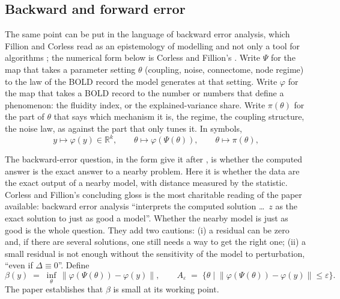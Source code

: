 \documentclass[11pt]{article}
\begin{document}
\subsection{Backward and forward error}
The same point can be put in the language of backward error analysis, which Fillion and Corless read as an epistemology of modelling and not only a tool for algorithms \parencite{fillion2014}; the numerical form below is Corless and Fillion's \parencite{corless2016}. Write $\Psi$ for the map that takes a parameter setting $\theta$ (coupling, noise, connectome, node regime) to the law of the BOLD record the model generates at that setting. Write $\varphi$ for the map that takes a BOLD record to the number or numbers that define a phenomenon: the fluidity index, or the explained-variance share. Write $\pi(\theta)$ for the part of $\theta$ that says which mechanism it is, the regime, the coupling structure, the noise law, as against the part that only tunes it. In symbols,
\begin{equation}
y \mapsto \varphi(y)\in\mathbb{R}^{k}, \qquad \theta \mapsto \varphi(\Psi(\theta)), \qquad \theta \mapsto \pi(\theta),
\label{eq:objects}
\end{equation}

The backward-error question, in the form \textcite{corless2016} give it after \textcite{wilkinson1963}, is whether the computed answer is the exact answer to a nearby problem. Here it is whether the data are the exact output of a nearby model, with distance measured by the statistic. Corless and Fillion's concluding gloss is the most charitable reading of the paper available: backward error analysis ``interprets the computed solution \ldots\ $z$ as the exact solution to just as good a model''. Whether the nearby model is just as good is the whole question. They add two cautions: (i) a residual can be zero and, if there are several solutions, one still needs a way to get the right one; (ii) a small residual is not enough without the sensitivity of the model to perturbation, ``even if $\Delta\equiv 0$''. Define
\begin{equation}
\beta(y)\;=\;\inf_{\theta}\,\bigl\|\varphi(\Psi(\theta))-\varphi(y)\bigr\|,
\qquad
A_{\varepsilon}\;=\;\bigl\{\theta \;\big|\; \|\varphi(\Psi(\theta))-\varphi(y)\|\le\varepsilon\bigr\}.
\label{eq:beta}
\end{equation}
The paper establishes that $\beta$ is small at its working point.
\end{document}
